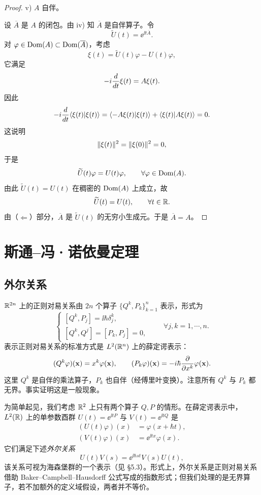 \begin{proof}
  v) $A$ 自伴。

  设 $\overline{A}$ 是 $A$ 的闭包。由 iv) 知 $\overline{A}$ 是自伴算子。令
  \[
  \widetilde{U}(t)=\ee^{\ii t\overline{A}}.
  \]
  对 $\varphi\in\operatorname{Dom}(A)\subset\operatorname{Dom}(\overline{A})$，考虑
  \[
  \xi(t)=\widetilde{U}(t)\varphi-U(t)\varphi,
  \]
  它满足
  \[
  -i\frac{d}{d t}\xi(t)=A\xi(t).
  \]
  因此
  \[
  -i\frac{d}{d t}\langle\xi(t)|\xi(t)\rangle
  =\langle-A\xi(t)|\xi(t)\rangle+\langle\xi(t)|A\xi(t)\rangle=0.
  \]
  这说明
  \[
  \lVert \xi(t)\rVert^2=\lVert \xi(0)\rVert^2=0,
  \]
  于是
  \[
  \widetilde{U}(t)\varphi=U(t)\varphi,\qquad\forall\varphi\in\operatorname{Dom}(A).
  \]
  由此 $\widetilde{U}(t)=U(t)$ 在稠密的 $\operatorname{Dom}(A)$ 上成立，故
  \[
  \widetilde{U}(t)=U(t),\qquad\forall t\in\mathbb{R}.
  \]
  由（$\Leftarrow$）部分，$\overline{A}$ 是 $\widetilde{U}(t)$ 的无穷小生成元。于是 $\overline{A}=A$。
\end{proof}


\section{斯通–冯·诺依曼定理}

\subsection{外尔关系}

$\mathbb{R}^{2n}$ 上的正则对易关系由 $2n$ 个算子 $\{Q^k,P_k\}_{k=1}^n$ 表示，形式为
\[
\begin{cases}
[Q^k,P_j]=\ii\hbar\delta^k_j,\\[2mm]
[Q^k,Q^j]=[P_k,P_j]=0,
\end{cases}
\qquad \forall j,k=1,\cdots,n.
\]
表示正则对易关系的标准方式是 $L^2(\mathbb{R}^n)$ 上的薛定谔表示：
\[
(Q^k\varphi)(\mathbf{x})=x^k\varphi(\mathbf{x}),\qquad
(P_k\varphi)(\mathbf{x})=-i\hbar\frac{\partial}{\partial x^k}\varphi(\mathbf{x}).
\]
这里 $Q^k$ 是自伴的乘法算子，$P_k$ 也自伴（经傅里叶变换）。注意所有 $Q^k$ 与 $P_k$ 都无界。事实证明这是一般现象。

为简单起见，我们考虑 $\mathbb{R}^2$ 上只有两个算子 $Q,P$ 的情形。在薛定谔表示中，$L^2(\mathbb{R})$ 上的单参数酉群 $U(t)=\ee^{\ii tP}$ 与 $V(t)=\ee^{\ii tQ}$ 是
\begin{align*}
(U(t)\varphi)(x)&=\varphi(x+\hbar t),\\
(V(t)\varphi)(x)&=\ee^{\ii tx}\varphi(x).
\end{align*}
它们满足下述\emph{外尔关系}
\[
U(t)V(s)=\ee^{\ii\hbar st}V(s)U(t),
\]
该关系可视为海森堡群的一个表示（见 §5.3）。形式上，外尔关系是正则对易关系借助 Baker–Campbell–Hausdorff 公式写成的指数形式；但我们处理的是无界算子，若不加额外的定义域假设，两者并不等价。


